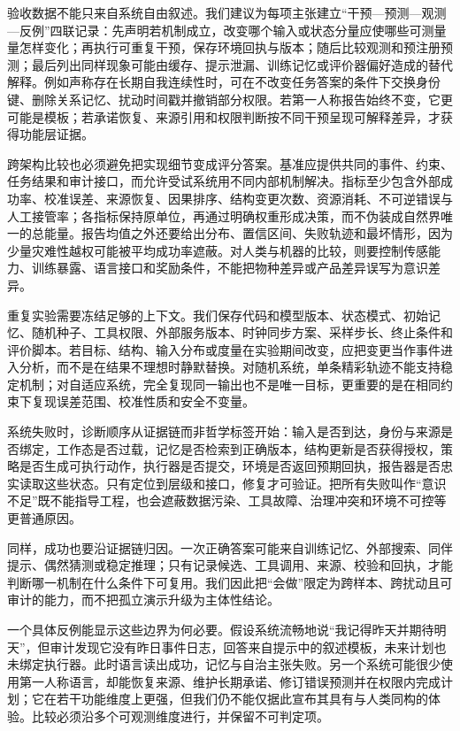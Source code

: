 验收数据不能只来自系统自由叙述。我们建议为每项主张建立“干预—预测—观测—反例”四联记录：先声明若机制成立，改变哪个输入或状态分量应使哪些可测量量怎样变化；再执行可重复干预，保存环境回执与版本；随后比较观测和预注册预测；最后列出同样现象可能由缓存、提示泄漏、训练记忆或评价器偏好造成的替代解释。例如声称存在长期自我连续性时，可在不改变任务答案的条件下交换身份键、删除关系记忆、扰动时间戳并撤销部分权限。若第一人称报告始终不变，它更可能是模板；若承诺恢复、来源引用和权限判断按不同干预呈现可解释差异，才获得功能层证据。

跨架构比较也必须避免把实现细节变成评分答案。基准应提供共同的事件、约束、任务结果和审计接口，而允许受试系统用不同内部机制解决。指标至少包含外部成功率、校准误差、来源恢复、因果排序、结构变更次数、资源消耗、不可逆错误与人工接管率；各指标保持原单位，再通过明确权重形成决策，而不伪装成自然界唯一的总能量。报告均值之外还要给出分布、置信区间、失败轨迹和最坏情形，因为少量灾难性越权可能被平均成功率遮蔽。对人类与机器的比较，则要控制传感能力、训练暴露、语言接口和奖励条件，不能把物种差异或产品差异误写为意识差异。

重复实验需要冻结足够的上下文。我们保存代码和模型版本、状态模式、初始记忆、随机种子、工具权限、外部服务版本、时钟同步方案、采样步长、终止条件和评价脚本。若目标、结构、输入分布或度量在实验期间改变，应把变更当作事件进入分析，而不是在结果不理想时静默替换。对随机系统，单条精彩轨迹不能支持稳定机制；对自适应系统，完全复现同一输出也不是唯一目标，更重要的是在相同约束下复现误差范围、校准性质和安全不变量。

系统失败时，诊断顺序从证据链而非哲学标签开始：输入是否到达，身份与来源是否绑定，工作态是否过载，记忆是否检索到正确版本，结构更新是否获得授权，策略是否生成可执行动作，执行器是否提交，环境是否返回预期回执，报告器是否忠实读取这些状态。只有定位到层级和接口，修复才可验证。把所有失败叫作“意识不足”既不能指导工程，也会遮蔽数据污染、工具故障、治理冲突和环境不可控等更普通原因。

同样，成功也要沿证据链归因。一次正确答案可能来自训练记忆、外部搜索、同伴提示、偶然猜测或稳定推理；只有记录候选、工具调用、来源、校验和回执，才能判断哪一机制在什么条件下可复用。我们因此把“会做”限定为跨样本、跨扰动且可审计的能力，而不把孤立演示升级为主体性结论。

一个具体反例能显示这些边界为何必要。假设系统流畅地说“我记得昨天并期待明天”，但审计发现它没有昨日事件日志，回答来自提示中的叙述模板，未来计划也未绑定执行器。此时语言读出成功，记忆与自治主张失败。另一个系统可能很少使用第一人称语言，却能恢复来源、维护长期承诺、修订错误预测并在权限内完成计划；它在若干功能维度上更强，但我们仍不能仅据此宣布其具有与人类同构的体验。比较必须沿多个可观测维度进行，并保留不可判定项。

